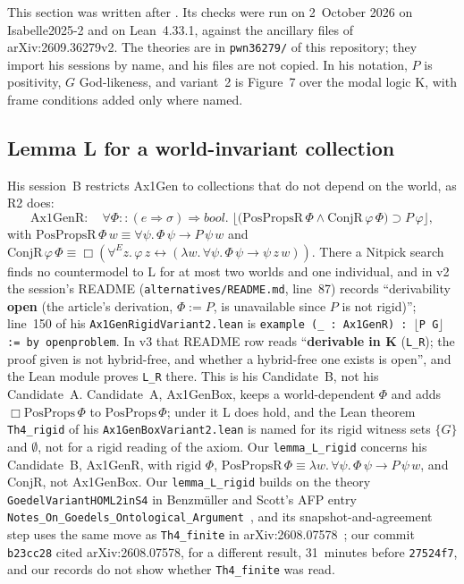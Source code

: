 \documentclass[11pt,a4paper]{article}
\newcommand{\valid}[1]{\lfloor #1 \rfloor}
\newcommand{\Nec}{\Box}
\newcommand{\allE}{\forall^{E}}
\newcommand{\lean}[1]{\texttt{#1}}
\theoremstyle{definition}
\theoremstyle{remark}
\begin{document}
This section was written after \cite{benzmuellerPWN2026}.
Its checks were run on 2~October 2026 on Isabelle2025-2 and on Lean~4.33.1,
against the ancillary files of arXiv:2609.36279v2.
The theories are in \lean{pwn36279/} of this repository; they import his
sessions by name, and his files are not copied.
In his notation, \(P\) is positivity, \(G\) God-likeness, and variant~2 is
Figure~7 over the modal logic K, with frame conditions added only where
named.

\subsection{Lemma L for a world-invariant collection}

His session~B restricts Ax1Gen to collections that do not depend on the
world, as R2 does:
\[
  \mathrm{Ax1GenR}:\quad
  \forall \Phi{::}(e \Rightarrow \sigma) \Rightarrow \mathit{bool}.\;
  \valid{\bigl(\mathrm{PosPropsR}\,\Phi \land \mathrm{ConjR}\,\varphi\,\Phi\bigr)
    \supset P\,\varphi},
\]
with \(\mathrm{PosPropsR}\,\Phi\,w \equiv \forall\psi.\,\Phi\,\psi
\longrightarrow P\,\psi\,w\) and \(\mathrm{ConjR}\,\varphi\,\Phi \equiv
\Nec(\allE z.\, \varphi\,z \leftrightarrow
(\lambda w.\,\forall\psi.\,\Phi\,\psi \longrightarrow \psi\,z\,w))\).
There a Nitpick search finds no countermodel to L for at most two worlds and
one individual, and in v2 the session's README (\lean{alternatives/README.md},
line~87) records ``derivability \textbf{open} (the article's derivation,
\(\Phi := P\), is unavailable since \(P\) is not rigid)''; line~150 of his
\lean{Ax1GenRigidVariant2.lean} is
\lean{example (\_ : Ax1GenR) : \(\lfloor\)P G\(\rfloor\) := by openproblem}.
In v3 that README row reads ``\textbf{derivable in K} (\lean{L\_R}); the
proof given is not hybrid-free, and whether a hybrid-free one exists is
open'', and the Lean module proves \lean{L\_R} there.
This is his Candidate~B, not his Candidate~A.
Candidate~A, Ax1GenBox, keeps a world-dependent \(\Phi\) and adds
\(\Nec\mathrm{PosProps}\,\Phi\) to \(\mathrm{PosProps}\,\Phi\); under it L
does hold, and the Lean theorem \lean{Th4\_rigid} of his
\lean{Ax1GenBoxVariant2.lean} is named for its rigid witness sets \(\{G\}\)
and \(\emptyset\), not for a rigid reading of the axiom.
Our \lean{lemma\_L\_rigid} concerns his Candidate~B, Ax1GenR, with rigid
\(\Phi\), \(\mathrm{PosPropsR}\,\Phi \equiv \lambda w.\,\forall\psi.\,
\Phi\,\psi \longrightarrow P\,\psi\,w\), and \(\mathrm{ConjR}\), not
Ax1GenBox.
Our \lean{lemma\_L\_rigid} builds on the theory \lean{GoedelVariantHOML2inS4} in Benzm\"uller and Scott's AFP entry \lean{Notes\_On\_Goedels\_Ontological\_Argument}~\cite{afpNotes2025}, and its snapshot-and-agreement step uses the same move as \lean{Th4\_finite} in arXiv:2608.07578~\cite{benzmueller2026}; our commit \lean{b23cc28} cited arXiv:2608.07578, for a different result, 31~minutes before \lean{27524f7}, and our records do not show whether \lean{Th4\_finite} was read.
\end{document}
